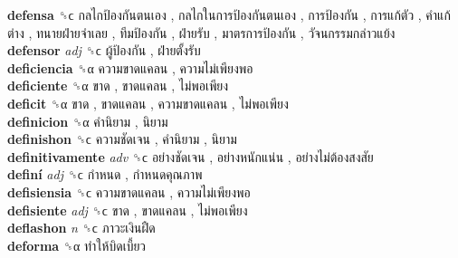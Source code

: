 \textbf{defensa} ␝ϲ   กลไกป้องกันตนเอง ,  กลไกในการป้องกันตนเอง ,  การป้องกัน ,  การแก้ตัว ,  คำแก้ต่าง ,  ทนายฝ่ายจำเลย ,  ทีมป้องกัน ,  ฝ่ายรับ ,  มาตรการป้องกัน ,  วัจนกรรมกล่าวแย้ง   \\
\textbf{defensor} \emph{adj}  ␝ϲ   ผู้ป้องกัน ,  ฝ่ายตั้งรับ   \\
\textbf{deficiencia} ␝α   ความขาดแคลน ,  ความไม่เพียงพอ   \\
\textbf{deficiente} ␝α   ขาด ,  ขาดแคลน ,  ไม่พอเพียง   \\
\textbf{deficit} ␝α   ขาด ,  ขาดแคลน ,  ความขาดแคลน ,  ไม่พอเพียง   \\
\textbf{definicion} ␝α   คำนิยาม ,  นิยาม   \\
\textbf{definishon} ␝ϲ   ความชัดเจน ,  คำนิยาม ,  นิยาม   \\
\textbf{definitivamente} \emph{adv}  ␝ϲ   อย่างชัดเจน ,  อย่างหนักแน่น ,  อย่างไม่ต้องสงสัย   \\
\textbf{definí} \emph{adj}  ␝ϲ   กำหนด ,  กำหนดคุณภาพ   \\
\textbf{defisiensia} ␝ϲ   ความขาดแคลน ,  ความไม่เพียงพอ   \\
\textbf{defisiente} \emph{adj}  ␝ϲ   ขาด ,  ขาดแคลน ,  ไม่พอเพียง   \\
\textbf{deflashon} \emph{n}  ␝ϲ   ภาวะเงินฝืด   \\
\textbf{deforma} ␝α   ทำให้บิดเบี้ยว   \\
